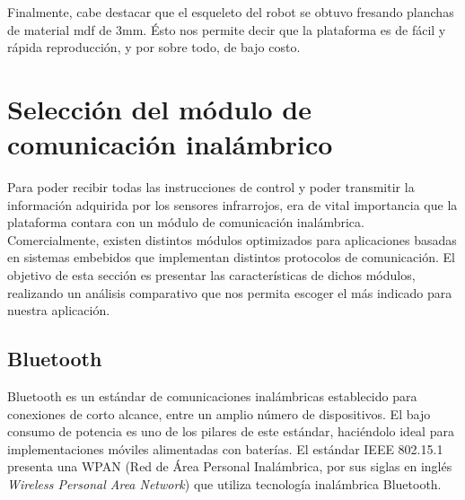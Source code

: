 \documentclass[conference,a4paper,9pt]{IEEEtran}
\begin{document}
Finalmente, cabe destacar que el esqueleto del robot se obtuvo fresando planchas de material mdf de $3\mathrm{mm}$. Ésto nos permite decir que la plataforma es de fácil y rápida reproducción, y por sobre todo, de bajo costo.

\section{Selección del módulo de comunicación inalámbrico}

Para poder recibir todas las instrucciones de control y poder transmitir la información adquirida por los sensores infrarrojos, era de vital importancia que la plataforma contara con un módulo de comunicación inalámbrica. Comercialmente, existen distintos módulos optimizados para aplicaciones basadas en sistemas embebidos que implementan distintos protocolos de comunicación. El objetivo de esta sección es presentar las características de dichos módulos, realizando un análisis comparativo que nos permita escoger el más indicado para nuestra aplicación.

\subsection{Bluetooth}

Bluetooth es un estándar de comunicaciones inalámbricas establecido para conexiones de corto alcance, entre un amplio número de dispositivos. El bajo consumo de potencia es uno de los pilares de este estándar, haciéndolo ideal para implementaciones móviles alimentadas con baterías. El estándar IEEE 802.15.1 presenta una WPAN (Red de Área Personal Inalámbrica, por sus siglas en inglés \textit{Wireless Personal Area Network}) que utiliza tecnología inalámbrica Bluetooth.
\end{document}
